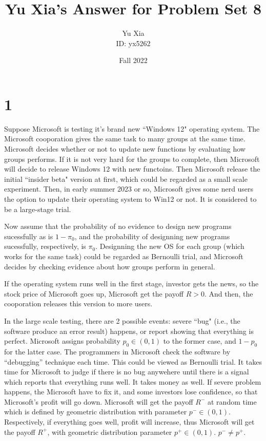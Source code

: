 \documentclass{article}
\author{Yu Xia \\ ID: yx5262}
\title{Yu Xia's Answer for Problem Set 8}
\date{Fall 2022}
\begin{document}
\maketitle

\nocite{*}

\section*{1}

Suppose Microsoft is testing it's brand new ``Windows 12" operating system. The Microsoft cooporation gives the same task to many groups at the same time. Microsoft decides whether or not to update new functions by evaluating how groups performs. If it is not very hard for the groups to complete, then Microsoft will decide to release Windows 12 with new functoins. Then Microsoft release the initial ``insider beta" version at first, which could be regarded as a small scale experiment. Then, in early summer 2023 or so, Microsoft gives some nerd users the option to update their operating system to Win12 or not. It is considered to be a large-stage trial. 

Now assume that the probability of no evidence to design new programs sucessfully as is $1-\pi_{0}$, and the probability of designning new programs sucessfully, respectively, is $\pi_{0}$. Designning the new OS for each group (which works for the same task) could be regarded as Bernoulli trial, and Microsoft decides by checking evidence about how groups perform in general.

If the operating system runs well in the first stage, investor gets the news, so the stock price of Microsoft goes up, Microsoft get the payoff $R>0$. And then, the cooporation releases this version to more users. 

In the large scale testing, there are 2 possible events: severe ``bug" (i.e., the software produce an error result) happens, or report showing that everything is perfect. Microsoft assigns probability $p_{0}\in\left(0,1\right)$ to the former case, and $1-p_{0}$ for the latter case. The programmers in Microsoft check the software by ``debugging'' technique each time. This could be viewed as Bernoulli trial. It takes time for Microsoft to judge if there is no bug anywehere until there is a signal which reports that everything runs well. It takes money as well. If severe problem happens, the Microsoft have to fix it, and some investors lose confidence, so that Microsoft's profit will go down. Microsoft will get the payoff $R^{-}$ at random time which is defined by geometric distribution with parameter $p^{-}\in\left(0,1\right)$. Respectively, if everything goes well, profit will increase, thus Microsoft will get the payoff $R^{+}$, with geometric distribution parameter $p^{+}\in\left(0,1\right)$. $p^{-}\neq p^{+}$.
\end{document}
